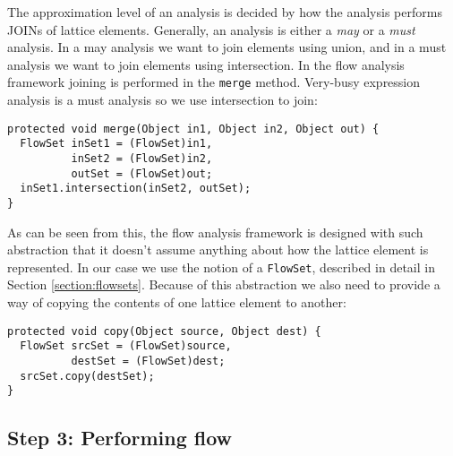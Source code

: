 \documentclass{article}
\newcommand{\code}[1]{\texttt{\small #1}}
\begin{document}
The approximation level of an analysis is decided by how the analysis
performs JOINs of lattice elements. Generally, an analysis is either a
\emph{may} or a \emph{must} analysis. In a may analysis we want to
join elements using union, and in a must analysis we want to join
elements using intersection. In the flow analysis framework joining is
performed in the \code{merge} method.
Very-busy expression analysis is a must analysis so we use
intersection to join:
\begin{center}
  \begin{minipage}{0.9 \linewidth}
    \begin{verbatim}
protected void merge(Object in1, Object in2, Object out) {
  FlowSet inSet1 = (FlowSet)in1,
          inSet2 = (FlowSet)in2,
          outSet = (FlowSet)out;
  inSet1.intersection(inSet2, outSet);
}
    \end{verbatim}
  \end{minipage}
\end{center}
As can be seen from this, the flow analysis framework is designed with
such abstraction that it doesn't assume anything about how the lattice
element is represented. In our case we use the notion of a
\code{FlowSet}, described in detail in
Section \ref{section:flowsets}. Because of this abstraction we also need to
provide a way of copying the contents of one lattice element to
another:
\begin{center}
  \begin{minipage}{0.9 \linewidth}
    \begin{verbatim}
protected void copy(Object source, Object dest) {
  FlowSet srcSet = (FlowSet)source,
          destSet = (FlowSet)dest;
  srcSet.copy(destSet);
}
    \end{verbatim}
  \end{minipage}
\end{center}

\subsection{Step 3: Performing flow}
\end{document}
